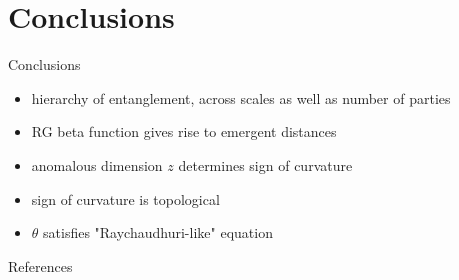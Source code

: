 \documentclass[11pt,aspectratio=169]{beamer}
\begin{document}
\section{Conclusions}
\begin{frame}{Conclusions}
	\begin{itemize}[<+-|alert@+>]
		\item hierarchy of entanglement, across scales as well as number of parties\\[20pt]
			\only<1>{
			\[S_{A \cup B} = S_{\text{larger}}\]}
		\item RG beta function gives rise to emergent distances\\[20pt]
			\only<2>{
			\[x_z(\beta), y_z(\beta)\]}
		\item anomalous dimension \(z\) determines sign of curvature\\[20pt]
			\only<3>{
			\[\kappa \begin{cases}
				> 0 \text{ if }z < 0\\
				= 0 \text{ if }z = 1 \\
				< 0 \text{ if }z > 1 \\
			\end{cases}\]}
		\item sign of curvature is topological\\[20pt]
			\only<4>{
			\[\text{sign}\left[\kappa_z\right] = \mathcal{W}_z\left( \gamma^* \right) \times \left[2\mathcal{W}^\prime_z\left( \alpha^* \right) - 1\right] \]}
		\item \(\theta\) satisfies "Raychaudhuri-like" equation
			\only<5>{
			\[\frac{\:\mathrm{d}\theta_z}{\:\mathrm{d}x_z} = \kappa\]}
	\end{itemize}
\end{frame}

\begin{frame}[allowframebreaks]{References}
\printbibliography
\end{frame}
\end{document}

